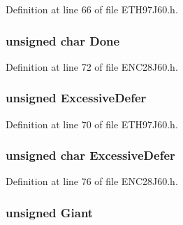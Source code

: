 Definition at line 66 of file E\+T\+H97\+J60.\+h.

\hypertarget{union_t_x_s_t_a_t_u_s_a148cf5e7845fc2154b6d1d79d272a568}{}
\subsubsection[{Done}]{\setlength{\rightskip}{0pt plus 5cm}unsigned char Done}\label{union_t_x_s_t_a_t_u_s_a148cf5e7845fc2154b6d1d79d272a568}


Definition at line 72 of file E\+N\+C28\+J60.\+h.

\hypertarget{union_t_x_s_t_a_t_u_s_a1ebbd836f37c7b74f1f9d9db42f1b0a0}{}
\subsubsection[{Excessive\+Defer}]{\setlength{\rightskip}{0pt plus 5cm}unsigned Excessive\+Defer}\label{union_t_x_s_t_a_t_u_s_a1ebbd836f37c7b74f1f9d9db42f1b0a0}


Definition at line 70 of file E\+T\+H97\+J60.\+h.

\hypertarget{union_t_x_s_t_a_t_u_s_a7f17a3642708ce521524037401df04a4}{}
\subsubsection[{Excessive\+Defer}]{\setlength{\rightskip}{0pt plus 5cm}unsigned char Excessive\+Defer}\label{union_t_x_s_t_a_t_u_s_a7f17a3642708ce521524037401df04a4}


Definition at line 76 of file E\+N\+C28\+J60.\+h.

\hypertarget{union_t_x_s_t_a_t_u_s_a556299c6baa30afba39e49bc5ffe549c}{}
\subsubsection[{Giant}]{\setlength{\rightskip}{0pt plus 5cm}unsigned Giant}\label{union_t_x_s_t_a_t_u_s_a556299c6baa30afba39e49bc5ffe549c}


